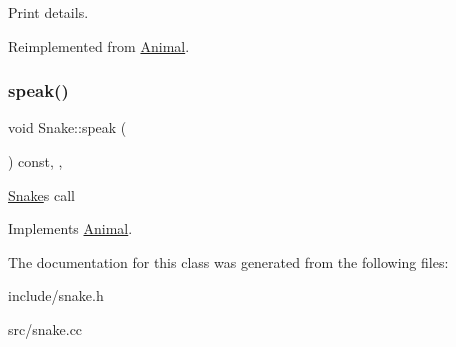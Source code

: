 Print details. 

Reimplemented from \hyperlink{classAnimal_a72994a2bb769667d277845351462246f}{Animal}.

\mbox{\label{classSnake_ade354a78eec6fbf9c3d72a519089c65d}} 
\subsubsection{\texorpdfstring{speak()}{speak()}}
{\footnotesize\ttfamily void Snake\+::speak (\begin{DoxyParamCaption}{ }\end{DoxyParamCaption}) const\hspace{0.3cm}{\ttfamily [override]}, {\ttfamily [virtual]}, {\ttfamily [noexcept]}}

\hyperlink{classSnake}{Snake}\textquotesingle{}s call 

Implements \hyperlink{classAnimal_ae3f640ffd5ebec66c3836b63fd11fc27}{Animal}.



The documentation for this class was generated from the following files\+:\begin{DoxyCompactItemize}
\item 
include/snake.\+h\item 
src/snake.\+cc\end{DoxyCompactItemize}

